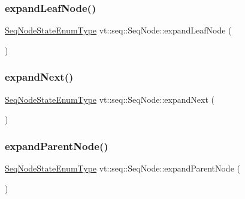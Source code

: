 \mbox{\label{structvt_1_1seq_1_1_seq_node_a579a9f1958bdd51915abc25f61fa1e5f}} 
\subsubsection{\texorpdfstring{expand\+Leaf\+Node()}{expandLeafNode()}}
{\footnotesize\ttfamily \hyperlink{namespacevt_1_1seq_ad7b0496818667d816e00f717491d3b92}{Seq\+Node\+State\+Enum\+Type} vt\+::seq\+::\+Seq\+Node\+::expand\+Leaf\+Node (\begin{DoxyParamCaption}{ }\end{DoxyParamCaption})}

\mbox{\label{structvt_1_1seq_1_1_seq_node_a73acc7cce4561dff26b900f8785add5f}} 
\subsubsection{\texorpdfstring{expand\+Next()}{expandNext()}}
{\footnotesize\ttfamily \hyperlink{namespacevt_1_1seq_ad7b0496818667d816e00f717491d3b92}{Seq\+Node\+State\+Enum\+Type} vt\+::seq\+::\+Seq\+Node\+::expand\+Next (\begin{DoxyParamCaption}{ }\end{DoxyParamCaption})}

\mbox{\label{structvt_1_1seq_1_1_seq_node_ac4cc38f1b735fbb58a0e610391f77c35}} 
\subsubsection{\texorpdfstring{expand\+Parent\+Node()}{expandParentNode()}}
{\footnotesize\ttfamily \hyperlink{namespacevt_1_1seq_ad7b0496818667d816e00f717491d3b92}{Seq\+Node\+State\+Enum\+Type} vt\+::seq\+::\+Seq\+Node\+::expand\+Parent\+Node (\begin{DoxyParamCaption}{ }\end{DoxyParamCaption})}

